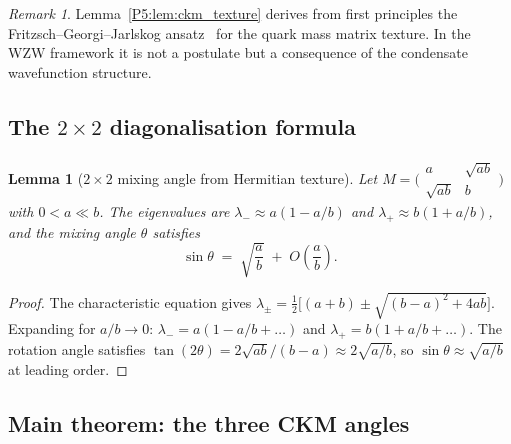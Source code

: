 \documentclass[11pt,a4paper]{article}
\newtheorem{lemma}[theorem]{Lemma}
\theoremstyle{definition}
\theoremstyle{remark}
\newtheorem{remark}[theorem]{Remark}
\begin{document}
\begin{remark}
\label{P5:rem:fgj_ansatz}
Lemma~\ref{P5:lem:ckm_texture} derives from first principles the
Fritzsch--Georgi--Jarlskog ansatz~\cite{Fritzsch1978,GJ1979} for the quark
mass matrix texture.  In the WZW framework it is not a postulate but a
consequence of the condensate wavefunction structure.
\end{remark}

\subsection{The $2\times2$ diagonalisation formula}

\begin{lemma}[$2\times2$ mixing angle from Hermitian texture]
\label{P5:lem:ckm_2x2}
Let $M = \bigl(\begin{smallmatrix} a & \sqrt{ab} \\ \sqrt{ab} & b \end{smallmatrix}\bigr)$
with $0 < a \ll b$.
The eigenvalues are $\lambda_- \approx a(1-a/b)$ and $\lambda_+ \approx b(1+a/b)$,
and the mixing angle $\theta$ satisfies
\begin{equation}
  \sin\theta \;=\; \sqrt{\frac{a}{b}} \;+\; O\!\left(\frac{a}{b}\right).
  \label{P5:eq:2x2_mixing}
\end{equation}
\end{lemma}

\begin{proof}
The characteristic equation gives
$\lambda_\pm = \tfrac{1}{2}\bigl[(a+b)\pm\sqrt{(b-a)^2+4ab}\bigr]$.
Expanding for $a/b\to0$:
$\lambda_- = a(1-a/b+\ldots)$ and $\lambda_+ = b(1+a/b+\ldots)$.
The rotation angle satisfies
$\tan(2\theta) = 2\sqrt{ab}/(b-a) \approx 2\sqrt{a/b}$,
so $\sin\theta \approx \sqrt{a/b}$ at leading order.
\end{proof}

\subsection{Main theorem: the three CKM angles}
\end{document}
